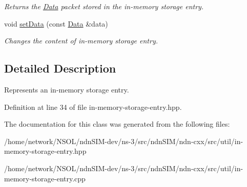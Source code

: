 \begin{DoxyCompactItemize}
\begin{DoxyCompactList}\small\item\em Returns the \hyperlink{classndn_1_1Data}{Data} packet stored in the in-\/memory storage entry. \end{DoxyCompactList}\item 
void \hyperlink{classndn_1_1util_1_1InMemoryStorageEntry_a42214b2b9daae302947f5b84c6270812}{set\+Data} (const \hyperlink{classndn_1_1Data}{Data} \&data)\hypertarget{classndn_1_1util_1_1InMemoryStorageEntry_a42214b2b9daae302947f5b84c6270812}{}\label{classndn_1_1util_1_1InMemoryStorageEntry_a42214b2b9daae302947f5b84c6270812}

\begin{DoxyCompactList}\small\item\em Changes the content of in-\/memory storage entry. \end{DoxyCompactList}\end{DoxyCompactItemize}


\subsection{Detailed Description}
Represents an in-\/memory storage entry. 

Definition at line 34 of file in-\/memory-\/storage-\/entry.\+hpp.



The documentation for this class was generated from the following files\+:\begin{DoxyCompactItemize}
\item 
/home/network/\+N\+S\+O\+L/ndn\+S\+I\+M-\/dev/ns-\/3/src/ndn\+S\+I\+M/ndn-\/cxx/src/util/in-\/memory-\/storage-\/entry.\+hpp\item 
/home/network/\+N\+S\+O\+L/ndn\+S\+I\+M-\/dev/ns-\/3/src/ndn\+S\+I\+M/ndn-\/cxx/src/util/in-\/memory-\/storage-\/entry.\+cpp\end{DoxyCompactItemize}
